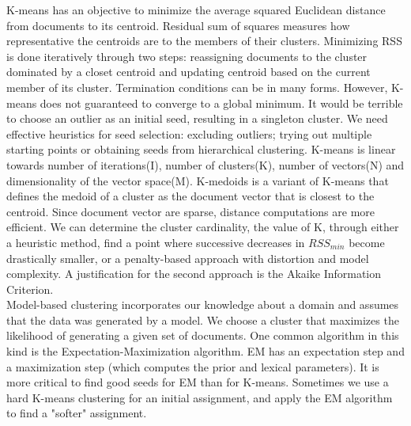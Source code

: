 \documentclass{sig-alternate-05-2015}
\begin{document}
K-means has an objective to minimize the average squared Euclidean distance from documents to its centroid. Residual sum of squares measures how representative the centroids are to the members of their clusters. Minimizing RSS is done iteratively through two steps: reassigning documents to the cluster dominated by a closet centroid and updating centroid based on the current member of its cluster. Termination conditions can be in many forms. However, K-means does not guaranteed to converge to a global minimum. It would be terrible to choose an outlier as an initial seed, resulting in a singleton cluster. We need effective heuristics for seed selection: excluding outliers; trying out multiple starting points or obtaining seeds from hierarchical clustering. K-means is linear towards number of iterations(I), number of clusters(K), number of vectors(N) and dimensionality of the vector space(M). K-medoids is a variant of K-means that defines the medoid of a cluster as the document vector that is closest to the centroid. Since document vector are sparse, distance computations are more efficient. We can determine the cluster cardinality, the value of K, through either a heuristic method, find a point where successive decreases in $RSS_{min}$ become drastically smaller, or a penalty-based approach with distortion and model complexity. A justification for the second approach is the Akaike Information Criterion. \\

Model-based clustering incorporates our knowledge about a domain and assumes that the data was generated by a model. We choose a cluster that maximizes the likelihood of generating a given set of documents. One common algorithm in this kind is the Expectation-Maximization algorithm. EM has an expectation step and a maximization step (which computes the prior and lexical parameters). It is more critical to find good seeds for EM than for K-means. Sometimes we use a hard K-means clustering for an initial assignment, and apply the EM algorithm to find a "softer" assignment. 


\end{document}
